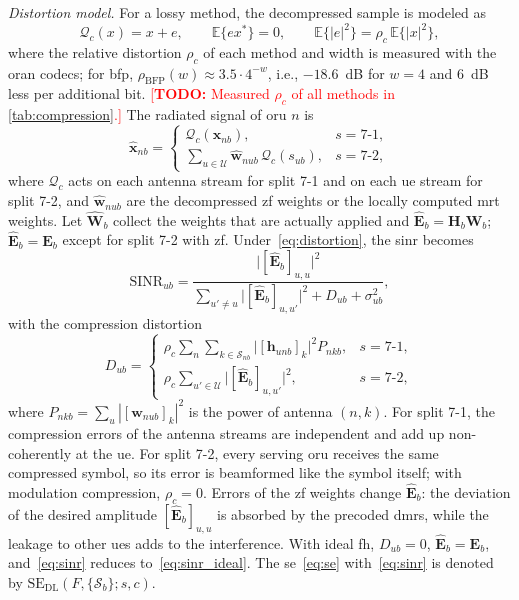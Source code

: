 \documentclass[10pt, final, journal, letterpaper, twocolumn]{IEEEtran}
\newcommand{\todo}[1]{\textcolor{red}{[\textbf{TODO:} #1]}}
\newcommand{\Uset}{\mathcal{U}}
\newcommand{\SINR}{\mathrm{SINR}}
\newcommand{\SE}{\mathrm{SE}}
\newcommand{\E}{\mathbb{E}}
\newcommand{\bh}{\mathbf{h}}
\newcommand{\bw}{\mathbf{w}}
\newcommand{\bwh}{\hat{\mathbf{w}}}
\newcommand{\bx}{\mathbf{x}}
\newcommand{\bxh}{\hat{\mathbf{x}}}
\newcommand{\bH}{\mathbf{H}}
\newcommand{\bWh}{\hat{\mathbf{W}}}
\newcommand{\bE}{\mathbf{E}}
\newcommand{\bEh}{\hat{\mathbf{E}}}
\newcommand{\sone}{7\text{-}1}
\newcommand{\stwo}{7\text{-}2}
\begin{document}
\emph{Distortion model.} For a lossy method, the decompressed sample is modeled as
\begin{equation}
  \mathcal{Q}_c(x) = x + e, \qquad \E\{e x^*\} = 0, \qquad \E\{|e|^2\} = \rho_c\, \E\{|x|^2\},
  \label{eq:distortion}
\end{equation}
where the relative distortion $\rho_c$ of each method and width is measured with the \gls{oran} codecs; for \gls{bfp}, $\rho_{\mathrm{BFP}}(w) \approx 3.5 \cdot 4^{-w}$, i.e., $-18.6$~dB for $w = 4$ and $6$~dB less per additional bit. \todo{Measured $\rho_c$ of all methods in \cref{tab:compression}.} The radiated signal of \gls{oru} $n$ is
\begin{equation}
  \bxh_{nb} =
  \begin{cases}
    \mathcal{Q}_c(\bx_{nb}), & s = \sone,\\[2pt]
    \sum_{u \in \Uset} \bwh_{nub}\, \mathcal{Q}_c(s_{ub}), & s = \stwo,
  \end{cases}
  \label{eq:radiated}
\end{equation}
where $\mathcal{Q}_c$ acts on each antenna stream for split 7-1 and on each \gls{ue} stream for split 7-2, and $\bwh_{nub}$ are the decompressed \gls{zf} weights or the locally computed \gls{mrt} weights. Let $\bWh_b$ collect the weights that are actually applied and $\bEh_b = \bH_b \bWh_b$; $\bEh_b = \bE_b$ except for split 7-2 with \gls{zf}. Under~\eqref{eq:distortion}, the \gls{sinr} becomes
\begin{equation}
  \SINR_{ub} = \frac{\big| [\bEh_b]_{u,u} \big|^2}{\sum_{u' \neq u} \big| [\bEh_b]_{u,u'} \big|^2 + D_{ub} + \sigma_{ub}^2},
  \label{eq:sinr}
\end{equation}
with the compression distortion
\begin{equation}
  D_{ub} =
  \begin{cases}
    \rho_c \sum_{n} \sum_{k \in \mathcal{S}_{nb}} \big| [\bh_{unb}]_k \big|^2 P_{nkb}, & s = \sone,\\[2pt]
    \rho_c \sum_{u' \in \Uset} \big| [\bEh_b]_{u,u'} \big|^2, & s = \stwo,
  \end{cases}
  \label{eq:dist}
\end{equation}
where $P_{nkb} = \sum_{u} |[\bw_{nub}]_k|^2$ is the power of antenna $(n,k)$. For split 7-1, the compression errors of the antenna streams are independent and add up non-coherently at the \gls{ue}. For split 7-2, every serving \gls{oru} receives the same compressed symbol, so its error is beamformed like the symbol itself; with modulation compression, $\rho_c = 0$. Errors of the \gls{zf} weights change $\bEh_b$: the deviation of the desired amplitude $[\bEh_b]_{u,u}$ is absorbed by the precoded \gls{dmrs}, while the leakage to other \glspl{ue} adds to the interference. With ideal \gls{fh}, $D_{ub} = 0$, $\bEh_b = \bE_b$, and~\eqref{eq:sinr} reduces to~\eqref{eq:sinr_ideal}. The \gls{se}~\eqref{eq:se} with~\eqref{eq:sinr} is denoted by $\SE_{\mathrm{DL}}(F, \{\mathcal{S}_b\}; s, c)$.
\end{document}
